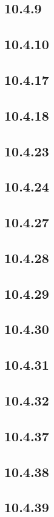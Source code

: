 \subsection*{10.4.9}
\subsection*{10.4.10}
\subsection*{10.4.17}
\subsection*{10.4.18}
\subsection*{10.4.23}
\subsection*{10.4.24}
\subsection*{10.4.27}
\subsection*{10.4.28}
\subsection*{10.4.29}
\subsection*{10.4.30}
\subsection*{10.4.31}
\subsection*{10.4.32}
\subsection*{10.4.37}
\subsection*{10.4.38}
\subsection*{10.4.39}
